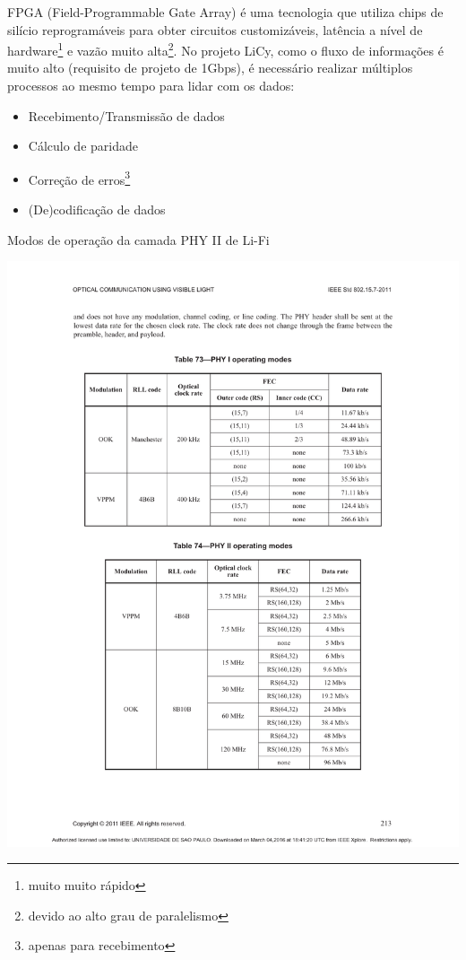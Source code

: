 	FPGA (Field-Programmable Gate Array) é uma tecnologia que utiliza chips de silício reprogramáveis para obter circuitos customizáveis, latência a nível de hardware\footnote{muito muito rápido} e vazão muito alta\footnote{devido ao alto grau de paralelismo}. No projeto LiCy, como o fluxo de informações é muito alto (requisito de projeto de 1Gbps), é necessário realizar múltiplos processos ao mesmo tempo para lidar com os dados:
	
	\begin{itemize}  
		\item Recebimento/Transmissão de dados
		\item Cálculo de paridade
		\item Correção de erros\footnote{apenas para recebimento}
		\item (De)codificação de dados
	\end{itemize}
	
	\begin{table}[h!]
		\caption{\label{tab_phy2} Modos de operação da camada PHY II de Li-Fi}
		\centering
			\includegraphics[clip, trim=46.55mm 36.79mm 46.74mm 142.30mm,  width=1.00\textwidth]{pag213.pdf}
	\end{table}
	
